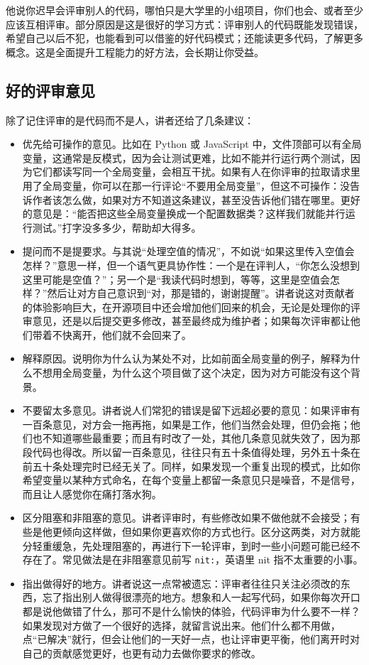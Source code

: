 \documentclass[a4paper]{article}
\begin{document}
他说你迟早会评审别人的代码，哪怕只是大学里的小组项目，你们也会、或者至少应该互相评审。部分原因是这是很好的学习方式：评审别人的代码既能发现错误，希望自己以后不犯，也能看到可以借鉴的好代码模式；还能读更多代码，了解更多概念。这是全面提升工程能力的好方法，会长期让你受益。

\subsection{好的评审意见}

除了记住评审的是代码而不是人，讲者还给了几条建议：

\begin{itemize}
\item 优先给可操作的意见。比如在 Python 或 JavaScript 中，文件顶部可以有全局变量，这通常是反模式，因为会让测试更难，比如不能并行运行两个测试，因为它们都读写同一个全局变量，会相互干扰。如果有人在你评审的拉取请求里用了全局变量，你可以在那一行评论“不要用全局变量”，但这不可操作：没告诉作者该怎么做，如果对方不知道这条建议，甚至没告诉他们错在哪里。更好的意见是：“能否把这些全局变量换成一个配置数据类？这样我们就能并行运行测试。”打字没多多少，帮助却大得多。
\item 提问而不是提要求。与其说“处理空值的情况”，不如说“如果这里传入空值会怎样？”意思一样，但一个语气更具协作性：一个是在评判人，“你怎么没想到这里可能是空值？”；另一个是“我读代码时想到，等等，这里是空值会怎样？”然后让对方自己意识到“对，那是错的，谢谢提醒”。讲者说这对贡献者的体验影响巨大，在开源项目中还会增加他们回来的机会，无论是处理你的评审意见，还是以后提交更多修改，甚至最终成为维护者；如果每次评审都让他们带着不快离开，他们就不会回来了。
\item 解释原因。说明你为什么认为某处不对，比如前面全局变量的例子，解释为什么不想用全局变量，为什么这个项目做了这个决定，因为对方可能没有这个背景。
\item 不要留太多意见。讲者说人们常犯的错误是留下远超必要的意见：如果评审有一百条意见，对方会一拖再拖，如果是工作，他们当然会处理，但仍会拖；他们也不知道哪些最重要；而且有时改了一处，其他几条意见就失效了，因为那段代码也得改。所以留一百条意见，往往只有五十条值得处理，另外五十条在前五十条处理完时已经无关了。同样，如果发现一个重复出现的模式，比如你希望变量以某种方式命名，在每个变量上都留一条意见只是噪音，不是信号，而且让人感觉你在痛打落水狗。
\item 区分阻塞和非阻塞的意见。讲者评审时，有些修改如果不做他就不会接受；有些是他更倾向这样做，但如果你更喜欢你的方式也行。区分这两类，对方就能分轻重缓急，先处理阻塞的，再进行下一轮评审，到时一些小问题可能已经不存在了。常见做法是在非阻塞意见前写 \texttt{nit:}，英语里 nit 指不太重要的小事。
\item 指出做得好的地方。讲者说这一点常被遗忘：评审者往往只关注必须改的东西，忘了指出别人做得很漂亮的地方。想象和人一起写代码，如果你每次开口都是说他做错了什么，那可不是什么愉快的体验，代码评审为什么要不一样？如果发现对方做了一个很好的选择，就留言说出来。他们什么都不用做，点“已解决”就行，但会让他们的一天好一点，也让评审更平衡，他们离开时对自己的贡献感觉更好，也更有动力去做你要求的修改。
\end{itemize}
\end{document}
